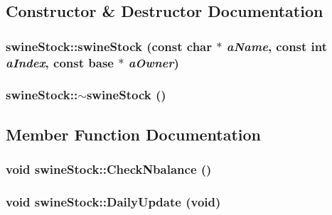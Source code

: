 \subsection{Constructor \& Destructor Documentation}
\hypertarget{classswine_stock_a135e6f925e3ab22a15d9f87cf8b93a1e}{
\subsubsection[{swineStock}]{\setlength{\rightskip}{0pt plus 5cm}swineStock::swineStock (const char $\ast$ {\em aName}, \/  const int {\em aIndex}, \/  const {\bf base} $\ast$ {\em aOwner})}}
\label{classswine_stock_a135e6f925e3ab22a15d9f87cf8b93a1e}
\hypertarget{classswine_stock_ab6aacb4f9339a5d1238fbc76d857f4ed}{
\subsubsection[{$\sim$swineStock}]{\setlength{\rightskip}{0pt plus 5cm}swineStock::$\sim$swineStock ()}}
\label{classswine_stock_ab6aacb4f9339a5d1238fbc76d857f4ed}


\subsection{Member Function Documentation}
\hypertarget{classswine_stock_ae916f8f1c9d3996c7708352a1ab8ab27}{
\subsubsection[{CheckNbalance}]{\setlength{\rightskip}{0pt plus 5cm}void swineStock::CheckNbalance ()}}
\label{classswine_stock_ae916f8f1c9d3996c7708352a1ab8ab27}
\hypertarget{classswine_stock_ae8e9dfd9c03e9ba170c697f7376b82bd}{
\subsubsection[{DailyUpdate}]{\setlength{\rightskip}{0pt plus 5cm}void swineStock::DailyUpdate (void)}}
\label{classswine_stock_ae8e9dfd9c03e9ba170c697f7376b82bd}


